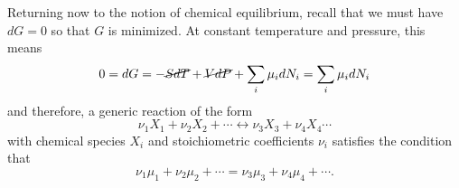 
Returning now to the notion of chemical equilibrium, recall that we must have $dG=0$ so that $G$ is minimized. At constant temperature and pressure, this means
\begin{equation}
  0 = dG = -\cancel{SdT} + \cancel{VdP} + \sum_i \mu_i dN_i = \sum_i\mu_i dN_i
\end{equation}
and therefore, a generic reaction of the form
\begin{equation}
  \nu_1X_1 + \nu_2X_2 + \cdots \leftrightarrow \nu_3 X_3 + \nu_4 X_4 \cdots
\end{equation}
with chemical species $X_i$ and stoichiometric coefficients $\nu_i$ satisfies the condition that
\begin{equation}
  \nu_1\mu_1 + \nu_2\mu_2 + \cdots = \nu_3\mu_3 + \nu_4\mu_4 + \cdots.
\end{equation}

